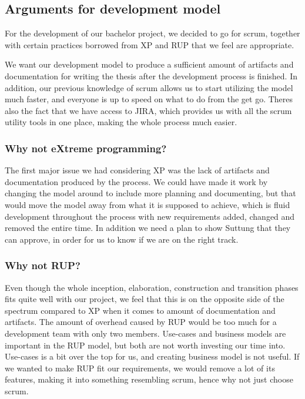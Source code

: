 \subsection{Arguments for development model}
For the development of our bachelor project, we decided to go for  scrum, together with certain practices borrowed from XP and RUP that we feel are appropriate.

We want our development model to produce a sufficient amount of artifacts and documentation for writing the thesis after the development process is finished.
In addition, our previous knowledge of scrum allows us to start utilizing the model much faster, and everyone is up to speed on what to do from the get go.
Theres also the fact that we have access to JIRA, which provides us with all the scrum utility tools in one place, making the whole process much easier.

\subsubsection{Why not eXtreme programming?}
The first major issue we had considering XP was the lack of artifacts and documentation produced by the process.
We could have made it work by changing the model around to include more planning and documenting, 
but that would move the model away from what it is supposed to achieve, 
which is fluid development throughout the process with new requirements added, changed and removed the entire time.
In addition we need a plan to show Suttung that they can approve, in order for us to know if we are on the right track.

\subsubsection{Why not RUP?}
Even though the whole inception, elaboration, construction and transition phases fits quite well with our project, 
we feel that this is on the opposite side of the spectrum compared to XP when it comes to amount of documentation and artifacts. 
The amount of overhead caused by RUP would be too much for a development team with only two members.
Use-cases and business models are important in the RUP model, but both are not worth investing our time into.
Use-cases is a bit over the top for us, and creating business model is not useful.
If we wanted to make RUP fit our requirements, we would remove a lot of its features, making it into something resembling scrum, hence why not just choose scrum.

